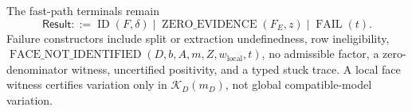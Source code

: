 The fast-path terminals remain
\[
\mathsf{Result}::=\operatorname{ID}(F,\delta)
\mid\operatorname{ZERO\_EVIDENCE}(F_E,z)
\mid\operatorname{FAIL}(t).
\]
Failure constructors include split or extraction undefinedness, row ineligibility, \(\operatorname{FACE\_NOT\_IDENTIFIED}(D,b,A,m,Z,w_{\mathrm{local}},t)\), no admissible factor, a zero-denominator witness, uncertified positivity, and a typed stuck trace.  A local face witness certifies variation only in \(\mathcal K_D(m_D)\), not global compatible-model variation.